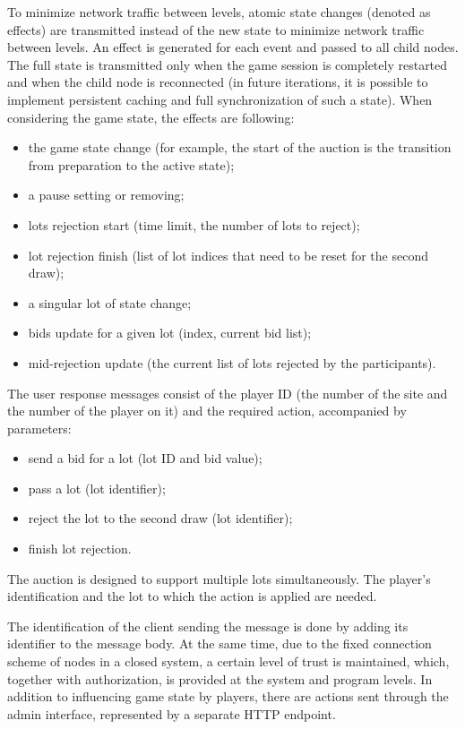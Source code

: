 \documentclass[
]{ceurart}
\begin{document}
To minimize network traffic between levels, atomic state changes (denoted as effects) are transmitted instead of the new state to minimize network traffic between levels. An effect is generated for each event and passed to all child nodes. The full state is transmitted only when the game session is completely restarted and when the child node is reconnected (in future iterations, it is possible to implement persistent caching and full synchronization of such a state).
When considering the game state, the effects are following:
\begin{itemize}
\item the game state change (for example, the start of the auction is the transition from preparation to the active state);
  \item  a pause setting or removing;
  \item  lots rejection start (time limit, the number of lots to reject);
  \item  lot rejection finish (list of lot indices that need to be reset for the second draw);
  \item  a singular lot of state change;
  \item  bids update for a given lot (index, current bid list);
  \item  mid-rejection update (the current list of lots rejected by the participants).
\end{itemize}

The user response messages consist of the player ID (the number of the site and the number of the player on it) and the required action, accompanied by parameters:
\begin{itemize}
\item  send a bid for a lot (lot ID and bid value);
\item  pass a lot (lot identifier);
\item  reject the lot to the second draw (lot identifier);
\item  finish lot rejection.
\end{itemize}
The auction is designed to support multiple lots simultaneously.  The player's identification and the lot to which the action is applied are needed.

The identification of the client sending the message is done by adding its identifier to the message body. At the same time, due to the fixed connection scheme of nodes in a closed system, a certain level of trust is maintained, which, together with authorization, is provided at the system and program levels. In addition to influencing game state by players, there are actions sent through the admin interface, represented by a separate HTTP endpoint.
\end{document}
